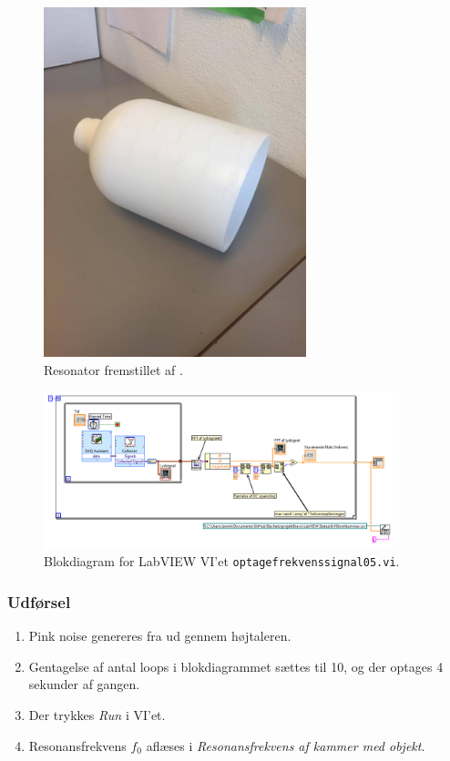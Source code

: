 	\begin{figure}[htb]
	\centering
	\includegraphics[width=3in]{resonator.jpg}
	\caption{Resonator fremstillet af .}
	\label{fig:resonator}	
	\end{figure}

	\begin{figure}[htb]
	\centering
	\includegraphics[width=4in]{optagefrekvenssignal05.png}
	\caption{Blokdiagram for LabVIEW VI'et \texttt{optagefrekvenssignal05.vi}.}
	\label{fig:optagefrekvenssignal05}	
	\end{figure}
	
	
	
	\subsubsection{Udførsel}
			
			\begin{enumerate}
			\item Pink noise genereres fra \onlineg  ud gennem højtaleren. 
			\item Gentagelse af antal loops i blokdiagrammet sættes til 10, og der optages 4 sekunder af gangen. 
			\item Der trykkes \textit{Run} i VI'et. 
			\item Resonansfrekvens $f_{0}$ aflæses i \textit{Resonansfrekvens af kammer med objekt}.
			\end{enumerate}
			
